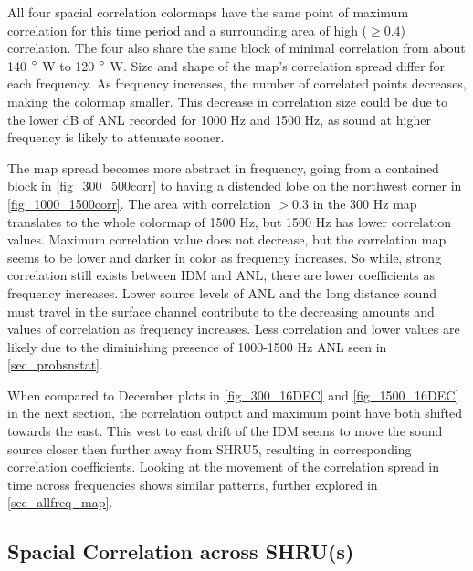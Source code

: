 All four spacial correlation colormaps have the same point of maximum correlation for this time period and a surrounding area of high ($\geq 0.4$) correlation. The four also share the same block of minimal correlation from about 140 $\degree$ W to 120 $\degree$ W. Size and shape of the map's correlation spread differ for each frequency. As frequency increases, the number of correlated points decreases, making the colormap smaller. This decrease in correlation size could be due to the lower dB of ANL recorded for 1000 Hz and 1500 Hz, as  sound at higher frequency is likely to attenuate sooner. 

The map spread becomes more abstract in frequency, going from a contained block in \autoref{fig_300_500corr} to having a distended lobe on the northwest corner in \autoref{fig_1000_1500corr}. The area with correlation $>0.3$ in the 300 Hz map translates to the whole colormap of 1500 Hz, but 1500 Hz has lower correlation values. Maximum correlation value does not decrease, but the correlation map seems to be lower and darker in color as frequency increases. So while, strong correlation still exists between IDM and ANL, there are lower coefficients as frequency increases. Lower source levels of ANL and the long distance sound must travel in the surface channel contribute to the decreasing amounts and values of correlation as frequency increases. Less correlation and lower values are likely due to the diminishing presence of 1000-1500 Hz ANL seen in \autoref{sec_probsnstat}.

When compared to December plots in \autoref{fig_300_16DEC} and \autoref{fig_1500_16DEC} in the next section, the correlation output and maximum point have both shifted towards the east. This west to east drift of the IDM seems to move the sound source closer then further away from SHRU5, resulting in corresponding correlation coefficients. Looking at the movement of the correlation spread in time across frequencies shows similar patterns, further explored in \autoref{sec_allfreq_map}.


\subsection{Spacial Correlation across SHRU(s)} \label{sec_corr_shru}

